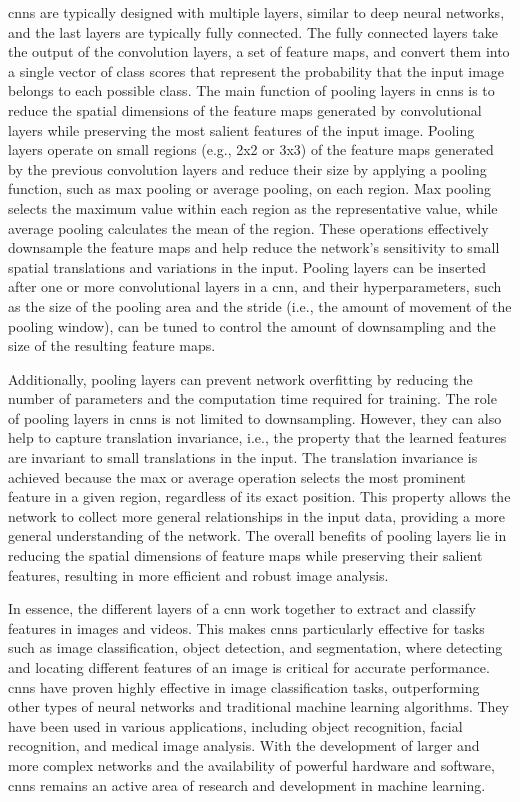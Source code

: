     \glspl{cnn} are typically designed with multiple layers, similar to deep neural networks, and the last layers are typically fully connected. The fully connected layers take the output of the convolution layers, a set of feature maps, and convert them into a single vector of class scores that represent the probability that the input image belongs to each possible class. The main function of pooling layers in \glspl{cnn} is to reduce the spatial dimensions of the feature maps generated by convolutional layers while preserving the most salient features of the input image. Pooling layers operate on small regions (e.g., 2x2 or 3x3) of the feature maps generated by the previous convolution layers and reduce their size by applying a pooling function, such as max pooling or average pooling, on each region. Max pooling selects the maximum value within each region as the representative value, while average pooling calculates the mean of the region. These operations effectively downsample the feature maps and help reduce the network's sensitivity to small spatial translations and variations in the input. Pooling layers can be inserted after one or more convolutional layers in a \gls{cnn}, and their hyperparameters, such as the size of the pooling area and the stride (i.e., the amount of movement of the pooling window), can be tuned to control the amount of downsampling and the size of the resulting feature maps.
    
    Additionally, pooling layers can prevent network overfitting by reducing the number of parameters and the computation time required for training. The role of pooling layers in \glspl{cnn} is not limited to downsampling. However, they can also help to capture translation invariance, i.e., the property that the learned features are invariant to small translations in the input. The translation invariance is achieved because the max or average operation selects the most prominent feature in a given region, regardless of its exact position. This property allows the network to collect more general relationships in the input data, providing a more general understanding of the network. The overall benefits of pooling layers lie in reducing the spatial dimensions of feature maps while preserving their salient features, resulting in more efficient and robust image analysis.
    
    In essence, the different layers of a \gls{cnn} work together to extract and classify features in images and videos. This makes \glspl{cnn} particularly effective for tasks such as image classification, object detection, and segmentation, where detecting and locating different features of an image is critical for accurate performance. \glspl{cnn} have proven highly effective in image classification tasks, outperforming other types of neural networks and traditional machine learning algorithms. They have been used in various applications, including object recognition, facial recognition, and medical image analysis. With the development of larger and more complex networks and the availability of powerful hardware and software, \glspl{cnn} remains an active area of research and development in machine learning.


